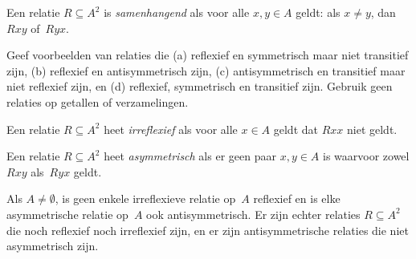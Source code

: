 \documentclass[../../../include/open-logic-section]{subfiles}
\begin{document}
\begin{defn}[Samenhangendheid]
Een relatie $R \subseteq A^2$ is \emph{samenhangend} als voor alle
$x,y\in A$ geldt: als $x \neq y$, dan $Rxy$ of~$Ryx$.
\end{defn}

\begin{prob}
Geef voorbeelden van relaties die (a) reflexief en symmetrisch maar
niet transitief zijn, (b) reflexief en antisymmetrisch zijn, (c)
antisymmetrisch en transitief maar niet reflexief zijn, en (d)
reflexief, symmetrisch en transitief zijn. Gebruik geen relaties op
getallen of verzamelingen.
\end{prob} 
 
\begin{defn}[Irreflexiviteit]
Een relatie $R \subseteq A^2$ heet \emph{irreflexief} als voor alle
$x \in A$ geldt dat $Rxx$ niet geldt.
\end{defn}

\begin{defn}[Asymmetrie]
Een relatie $R \subseteq A^2$ heet \emph{asymmetrisch} als er geen paar
$x,y\in A$ is waarvoor zowel $Rxy$ als~$Ryx$ geldt.
\end{defn}

Als $A \neq \emptyset$, is geen enkele irreflexieve relatie op~$A$
reflexief en is elke asymmetrische relatie op~$A$ ook
antisymmetrisch. Er zijn echter relaties $R \subseteq A^2$ die noch
reflexief noch irreflexief zijn, en er zijn antisymmetrische relaties
die niet asymmetrisch zijn.
\end{document}
